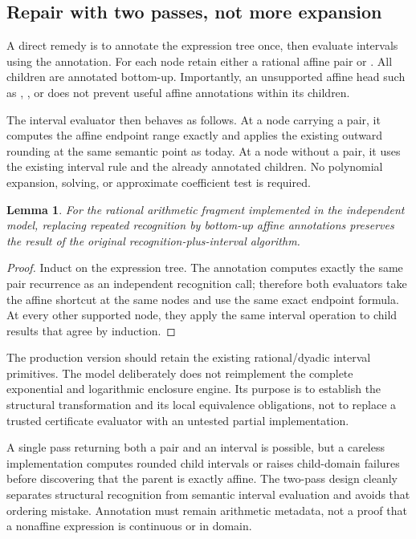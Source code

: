\documentclass[11pt,a4paper]{article}
\newcommand{\code}[1]{\texttt{\detokenize{#1}}}
\newtheorem{lemma}[proposition]{Lemma}
\begin{document}
\subsection{Repair with two passes, not more expansion}
A direct remedy is to annotate the expression tree once, then evaluate intervals
using the annotation. For each node retain either a rational affine pair or
\code{NotAffine}. All children are annotated bottom-up. Importantly, an
unsupported affine head such as \code{Power}, \code{Log}, or \code{Exp} does not
prevent useful affine annotations within its children.

The interval evaluator then behaves as follows. At a node carrying a pair, it
computes the affine endpoint range exactly and applies the existing outward
rounding at the same semantic point as today. At a node without a pair, it uses
the existing interval rule and the already annotated children. No polynomial
expansion, solving, or approximate coefficient test is required.

\begin{lemma}
For the rational arithmetic fragment implemented in the independent model,
replacing repeated recognition by bottom-up affine annotations preserves the
result of the original recognition-plus-interval algorithm.
\end{lemma}
\begin{proof}
Induct on the expression tree. The annotation computes exactly the same pair
recurrence as an independent recognition call; therefore both evaluators take
the affine shortcut at the same nodes and use the same exact endpoint formula.
At every other supported node, they apply the same interval operation to child
results that agree by induction.
\end{proof}

The production version should retain the existing rational/dyadic interval
primitives. The model deliberately does not reimplement the complete exponential
and logarithmic enclosure engine. Its purpose is to establish the structural
transformation and its local equivalence obligations, not to replace a trusted
certificate evaluator with an untested partial implementation.

A single pass returning both a pair and an interval is possible, but a careless
implementation computes rounded child intervals or raises child-domain failures
before discovering that the parent is exactly affine. The two-pass design cleanly
separates structural recognition from semantic interval evaluation and avoids
that ordering mistake. Annotation must remain arithmetic metadata, not a proof
that a nonaffine expression is continuous or in domain.
\end{document}
